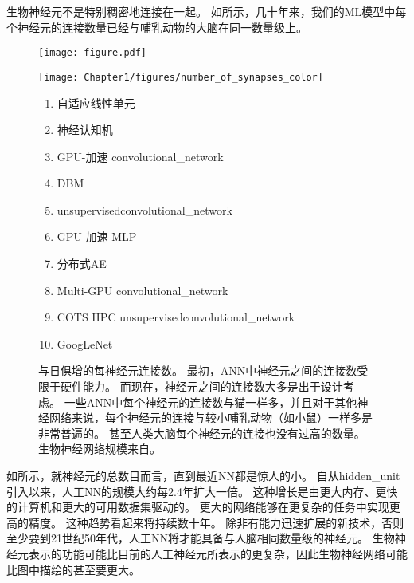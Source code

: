 生物神经元不是特别稠密地连接在一起。
如所示，几十年来，我们的\gls{ML}模型中每个神经元的连接数量已经与哺乳动物的大脑在同一数量级上。

\begin{figure}[!htb]
\ifOpenSource
\centerline{\texttt{[image: figure.pdf]}}
\else
\centerline{\texttt{[image: Chapter1/figures/number\_of\_synapses\_color]}}
\fi
\caption{与日俱增的每神经元连接数。 %
最初，\gls{ANN}中神经元之间的连接数受限于硬件能力。
而现在，神经元之间的连接数大多是出于设计考虑。
一些\gls{ANN}中每个神经元的连接数与猫一样多，并且对于其他神经网络来说，每个神经元的连接与较小哺乳动物（如小鼠）一样多是非常普遍的。
甚至人类大脑每个神经元的连接也没有过高的数量。
生物神经网络规模来自\citet{number_of_neurons}。
}
\label{fig:chap1_number_of_synapses_color}
{\tiny
\begin{enumerate}
  \itemsep0em
  \item %
    自适应线性单元~\citep{Widrow60}
  \item %
    神经认知机~\citep{Fukushima80}
  \item %
    GPU-加速 \gls{convolutional_network}~\citep{chellapilla:inria-00112631}
  \item %
    \gls{DBM}~\citep{SalHinton09}
  \item %
    \gls{unsupervised}\gls{convolutional_network}~\citep{Jarrett-ICCV2009-small}
  \item %
    GPU-加速 \gls{MLP}~\citep{Ciresan-2010}
  \item %
    分布式\gls{AE}~\citep{QuocLe-ICML2012}
  \item %
    Multi-GPU \gls{convolutional_network}~\citep{Krizhevsky-2012-small}
  \item %
    COTS HPC  \gls{unsupervised}\gls{convolutional_network}~\citep{icml2013_coates13}
  \item %
    GoogLeNet~\citep{Szegedy-et-al-arxiv2014}
\end{enumerate}
} %
\end{figure}

如所示，就神经元的总数目而言，直到最近\gls{NN}都是惊人的小。
自从\gls{hidden_unit}引入以来，人工\gls{NN}的规模大约每2.4年扩大一倍。
这种增长是由更大内存、更快的计算机和更大的可用数据集驱动的。
更大的网络能够在更复杂的任务中实现更高的精度。
这种趋势看起来将持续数十年。
除非有能力迅速扩展的新技术，否则至少要到21世纪50年代，人工\gls{NN}将才能具备与人脑相同数量级的神经元。
生物神经元表示的功能可能比目前的人工神经元所表示的更复杂，因此生物神经网络可能比图中描绘的甚至要更大。

